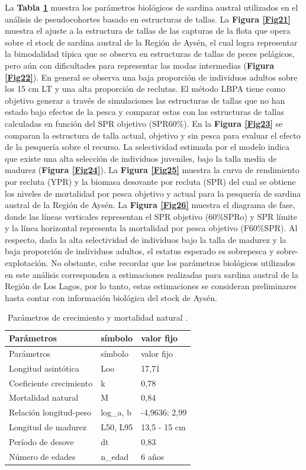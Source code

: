\documentclass[
  spanish,
]{article}
\begin{document}
La \textbf{Tabla \ref{Tab14}} muestra los parámetros biológicos de
sardina austral utilizados en el análisis de pseudocohortes basado en
estructuras de tallas. La \textbf{Figura \ref{Fig21}} muestra el ajuste
a la estructura de tallas de las capturas de la flota que opera sobre el
stock de sardina austral de la Región de Aysén, el cual logra
representar la bimodalidad típica que se observa en estructuras de
tallas de peces pelágicos, pero aún con dificultades para representar
las modas intermedias (\textbf{Figura \ref{Fig22}}). En general se
observa una baja proporción de individuos adultos sobre los 15 cm LT y
una alta proporción de reclutas. El método LBPA tiene como objetivo
generar a través de simulaciones las estructuras de tallas que no han
estado bajo efectos de la pesca y comparar estas con las estructuras de
tallas calculadas en función del SPR objetivo (SPR60\%). En la
\textbf{Figura \ref{Fig23}} se comparan la estructura de talla actual,
objetivo y sin pesca para evaluar el efecto de la pesquería sobre el
recurso. La selectividad estimada por el modelo indica que existe una
alta selección de individuos juveniles, bajo la talla media de madurez
(\textbf{Figura \ref{Fig24}}). La \textbf{Figura \ref{Fig25}} muestra la
curva de rendimiento por recluta (YPR) y la biomasa desovante por
recluta (SPR) del cual se obtiene los niveles de mortalidad por pesca
objetivo y actual para la pesquería de sardina austral de la Región de
Aysén. La \textbf{Figura \ref{Fig26}} muestra el diagrama de fase, donde
las líneas verticales representan el SPR objetivo (60\%SPRo) y SPR
límite y la línea horizontal representa la mortalidad por pesca objetivo
(F60\%SPR). Al respecto, dada la alta selectividad de individuos bajo la
talla de madurez y la baja proporción de individuos adultos, el estatus
esperado es sobrepesca y sobre-explotación. No obstante, cabe recordar
que los parámetros biológicos utilizados en este análisis corresponden a
estimaciones realizadas para sardina austral de la Región de Los Lagos,
por lo tanto, estas estimaciones se consideran preliminares hasta contar
con información biológica del stock de Aysén.

\vspace{0.5cm}

\begin{longtable}[]{@{}lll@{}}
\caption{\label{Tab14} Parámetros de crecimiento y mortalidad natural
.}\tabularnewline
\toprule
Parámetros & símbolo & valor fijo\tabularnewline
\midrule
\endfirsthead
\toprule
Parámetros & símbolo & valor fijo\tabularnewline
\midrule
\endhead
Longitud asintótica & Loo & 17,71\tabularnewline
Coeficiente crecimiento & k & 0,78\tabularnewline
Mortalidad natural & M & 0,84\tabularnewline
Relación longitud-peso & log\_a, b & -4,9636; 2,99\tabularnewline
Longitud de madurez & L50, L95 & 13,5 - 15 cm\tabularnewline
Período de desove & dt & 0,83\tabularnewline
Número de edades & n\_edad & 6 años\tabularnewline
\bottomrule
\end{longtable}
\end{document}
